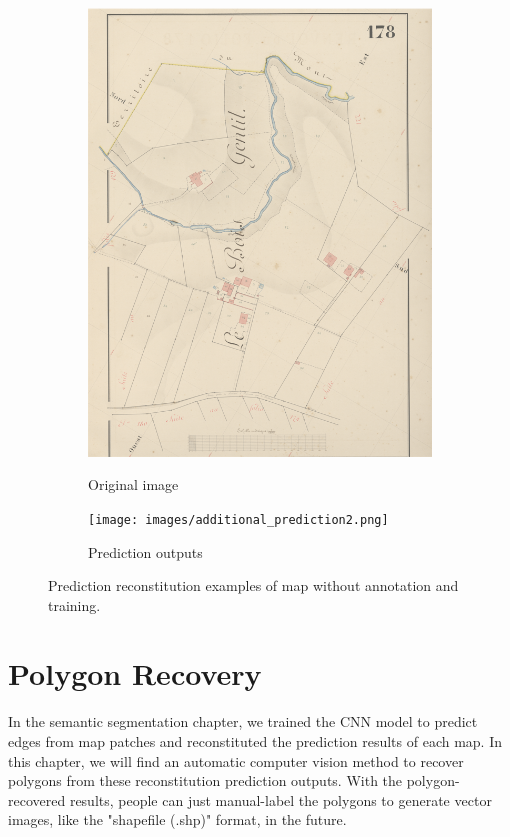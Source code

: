 \documentclass[12pt]{article}
\begin{document}
\begin{figure}[H]
	\begin{subfigure}[b]{.4\textwidth}
		\centering
		\includegraphics[width=1\linewidth]{images/additional_image2.png}  
		\label{fig:original-img}
		\caption{Original image}
	\end{subfigure}
	\begin{subfigure}[b]{.4\textwidth}
		\centering
		\texttt{[image: images/additional\_prediction2.png]}  
		\label{fig:original-pre}
		\caption{Prediction outputs}
	\end{subfigure}
	
	
	\caption{Prediction reconstitution examples of map without annotation and training.}
	\label{fig:additional-reconstitution}
\end{figure}


\section{Polygon Recovery}
In the semantic segmentation chapter, we trained the CNN model to predict edges from map patches and reconstituted the prediction results of each map. In this chapter, we will find an automatic computer vision method to recover polygons from these reconstitution prediction outputs. With the polygon-recovered results, people can just manual-label the polygons to generate vector images, like the "shapefile (.shp)" format, in the future.
\end{document}
